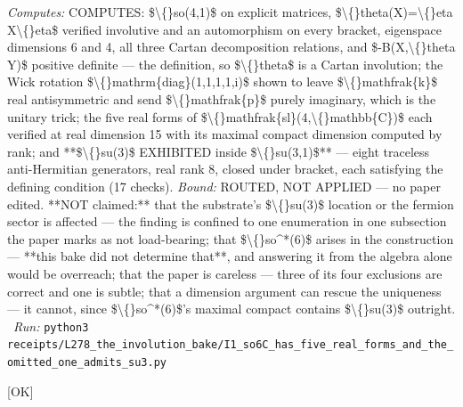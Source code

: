 \begin{description}
\emph{Computes:} COMPUTES: \$\textbackslash\{\}so(4,1)\$ on explicit matrices, \$\textbackslash\{\}theta(X)=\textbackslash\{\}eta X\textbackslash\{\}eta\$ verified involutive and an automorphism on every bracket, eigenspace dimensions 6 and 4, all three Cartan decomposition relations, and \$-B(X,\textbackslash\{\}theta Y)\$ positive definite --- the definition, so \$\textbackslash\{\}theta\$ is a Cartan involution; the Wick rotation \$\textbackslash\{\}mathrm\{diag\}(1,1,1,1,i)\$ shown to leave \$\textbackslash\{\}mathfrak\{k\}\$ real antisymmetric and send \$\textbackslash\{\}mathfrak\{p\}\$ purely imaginary, which is the unitary trick; the five real forms of \$\textbackslash\{\}mathfrak\{sl\}(4,\textbackslash\{\}mathbb\{C\})\$ each verified at real dimension 15 with its maximal compact dimension computed by rank; and **\$\textbackslash\{\}su(3)\$ EXHIBITED inside \$\textbackslash\{\}su(3,1)\$** --- eight traceless anti-Hermitian generators, real rank 8, closed under bracket, each satisfying the defining condition (17 checks).
 \emph{Bound:} ROUTED, NOT APPLIED --- no paper edited. **NOT claimed:** that the substrate's \$\textbackslash\{\}su(3)\$ location or the fermion sector is affected --- the finding is confined to one enumeration in one subsection the paper marks as not load-bearing; that \$\textbackslash\{\}so\textasciicircum{}*(6)\$ arises in the construction --- **this bake did not determine that**, and answering it from the algebra alone would be overreach; that the paper is careless --- three of its four exclusions are correct and one is subtle; that a dimension argument can rescue the uniqueness --- it cannot, since \$\textbackslash\{\}so\textasciicircum{}*(6)\$'s maximal compact contains \$\textbackslash\{\}su(3)\$ outright.
\ \emph{Run:} \texttt{python3 receipts/L278\_the\_involution\_bake/I1\_so6C\_has\_five\_real\_forms\_and\_the\_omitted\_one\_admits\_su3.py}
\item[\label{rcpt:S1_so42_is_not_another_real_form_it_is_the_substrates_own_dual}\textbf{}\quad\texttt{S1\_so42\_is\_not\_another\_real\_form\_it\_is\_the\_substrates\_own\_dual}]\hfill\textsf{[OK]}\\

\end{description}
